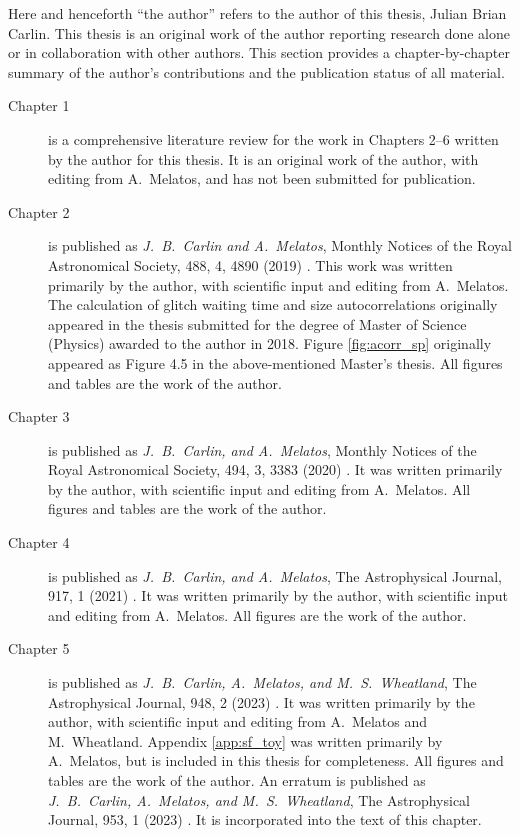 Here and henceforth ``the author'' refers to the author of this thesis, Julian Brian Carlin. This thesis is an original work of the author reporting research done alone or in collaboration with other authors. 
This section provides a chapter-by-chapter summary of the author's contributions and the publication status of all material.

\begin{description}
  \item[Chapter 1] is a comprehensive literature review for the work in Chapters 2--6 written by the author for this thesis. It is an original work of the author, with editing from A.~Melatos, and has not been submitted for publication.
  \item[Chapter 2] is published as \emph{J.~B.~Carlin and A.~Melatos}, Monthly Notices of the Royal Astronomical Society, 488, 4, 4890 (2019) \citep{Carlin2019ac}. This work was written primarily by the author, with scientific input and editing from A.~Melatos. The calculation of glitch waiting time and size autocorrelations originally appeared in the thesis submitted for the degree of Master of Science (Physics) awarded to the author in 2018. Figure \ref{fig:acorr_sp} originally appeared as Figure 4.5 in the above-mentioned Master's thesis. All figures and tables are the work of the author.
  \item[Chapter 3] is published as \emph{J.~B.~Carlin, and A.~Melatos}, Monthly Notices of the Royal Astronomical Society, 494, 3, 3383 (2020) \citep{Carlin2020bsa}. It was written primarily by the author, with scientific input and editing from A.~Melatos. All figures and tables are the work of the author.
  \item[Chapter 4] is published as \emph{J.~B.~Carlin, and A.~Melatos}, The Astrophysical Journal, 917, 1 (2021) \citep{Carlin2021endog}. It was written primarily by the author, with scientific input and editing from A.~Melatos. All figures are the work of the author.
  \item[Chapter 5] is published as \emph{J.~B.~Carlin, A.~Melatos, and M.~S.~Wheatland}, The Astrophysical Journal, 948, 2 (2023) \citep{Carlin2023sf}. It was written primarily by the author, with scientific input and editing from A.~Melatos and M.~Wheatland. Appendix \ref{app:sf_toy} was written primarily by A.~Melatos, but is included in this thesis for completeness. All figures and tables are the work of the author. An erratum is published as \emph{J.~B.~Carlin, A.~Melatos, and M.~S.~Wheatland}, The Astrophysical Journal, 953, 1 (2023) \citep{Carlin2023sferr}. It is incorporated into the text of this chapter.

\end{description}
